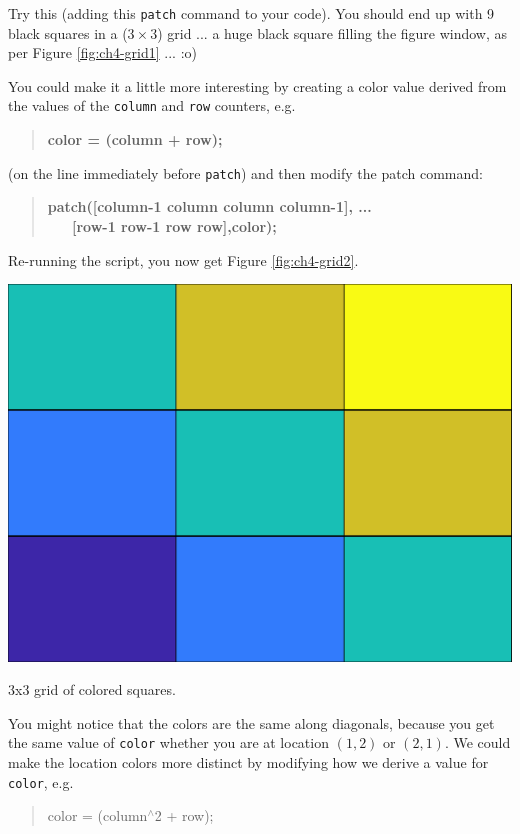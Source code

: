 \documentclass{tufte-book} %
\newenvironment{docspec}{\begin{quotation}\ttfamily\parskip0pt\parindent0pt\ignorespaces}{\end{quotation}}
\newenvironment{docspecbold}{\begin{quotation}\ttfamily\bfseries\parskip0pt\parindent0pt\ignorespaces}{\end{quotation}}
\begin{document}
Try this (adding this \texttt{patch} command to your code). You should end up with 9 black squares in a (\(3\times3\)) grid ... a huge black square filling the figure window, as per Figure \ref{fig:ch4-grid1} ... :o)

You could make it a little more interesting by creating a color value derived from the values of the \texttt{column} and \texttt{row} counters, e.g.
\begin{docspecbold}
color = (column + row);
\end{docspecbold}
(on the line immediately before \texttt{patch}) and then modify the patch command:
\begin{docspecbold}
patch([column-1 column column column-1], ...\\
\ \ \ [row-1 row-1 row row],color);
\end{docspecbold}
Re-running the script, you now get Figure \ref{fig:ch4-grid2}.

\begin{marginfigure}[-2.5in]
\includegraphics[width=\linewidth]{ch4-grid2.eps}
\caption{3x3 grid of colored squares.}
\label{fig:ch4-grid2}
\end{marginfigure}

You might notice that the colors are the same along diagonals, because you get the same value of \texttt{color} whether you are at location \((1,2)\) or \((2,1)\). We could make the location colors more distinct by modifying how we derive a value for \texttt{color}, e.g.
\begin{docspec}
color = (column\(^{\wedge}\)2 + row);
\end{docspec}
\end{document}
